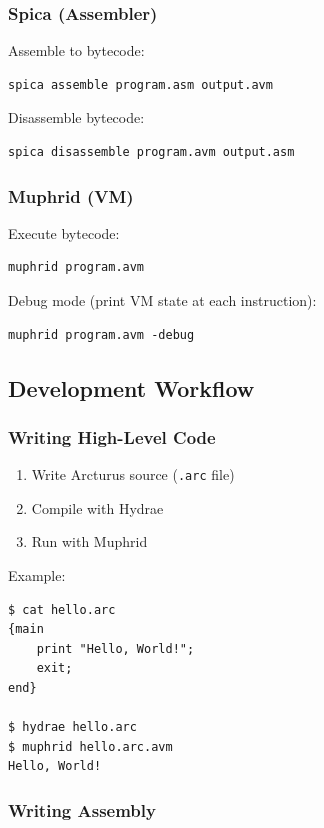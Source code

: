 \documentclass[11pt,a4paper]{article}
\begin{document}
\subsubsection{Spica (Assembler)}

Assemble to bytecode:
\begin{verbatim}
spica assemble program.asm output.avm
\end{verbatim}

Disassemble bytecode:
\begin{verbatim}
spica disassemble program.avm output.asm
\end{verbatim}

\subsubsection{Muphrid (VM)}

Execute bytecode:
\begin{verbatim}
muphrid program.avm
\end{verbatim}

Debug mode (print VM state at each instruction):
\begin{verbatim}
muphrid program.avm -debug
\end{verbatim}

\subsection{Development Workflow}

\subsubsection{Writing High-Level Code}

\begin{enumerate}
    \item Write Arcturus source (\texttt{.arc} file)
    \item Compile with Hydrae
    \item Run with Muphrid
\end{enumerate}

Example:
\begin{verbatim}
$ cat hello.arc
{main
    print "Hello, World!";
    exit;
end}

$ hydrae hello.arc
$ muphrid hello.arc.avm
Hello, World!
\end{verbatim}

\subsubsection{Writing Assembly}
\end{document}
